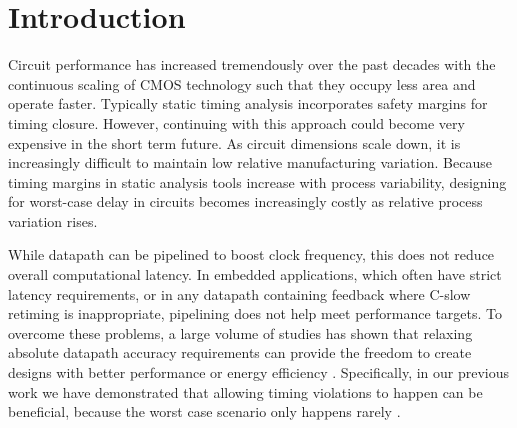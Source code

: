 \documentclass{acm_proc_article-sp}
\begin{document}
\vspace{-1ex}
\vspace{-1ex}

\section{Introduction}
Circuit performance has increased tremendously over the past decades with the continuous scaling of CMOS technology such that they occupy less area and operate faster. Typically static timing analysis incorporates safety margins for timing closure. However, continuing with this approach could become very expensive in the short term future. As circuit dimensions scale down, it is increasingly difficult to maintain low relative manufacturing variation. Because timing margins in static analysis tools increase with process variability, designing for worst-case delay in circuits becomes increasingly costly as relative process variation rises.\vspace{-1ex}

While datapath can be pipelined to boost clock frequency, this does not reduce overall computational latency. In  embedded applications, which often have strict latency requirements, or in any datapath containing feedback where C-slow retiming is inappropriate, pipelining does not help meet performance targets. To overcome these problems, a large volume of studies has shown that relaxing absolute datapath accuracy requirements can provide the freedom to create designs with better performance or energy efficiency \cite{Razor2004,Gupta2013TransCADICS,Undersigned2x2multiplier}. Specifically, in our previous work we have demonstrated that allowing timing violations to happen can be beneficial, because the worst case scenario only happens rarely \cite{SKfccm13}.\vspace{-1ex}
\end{document}
